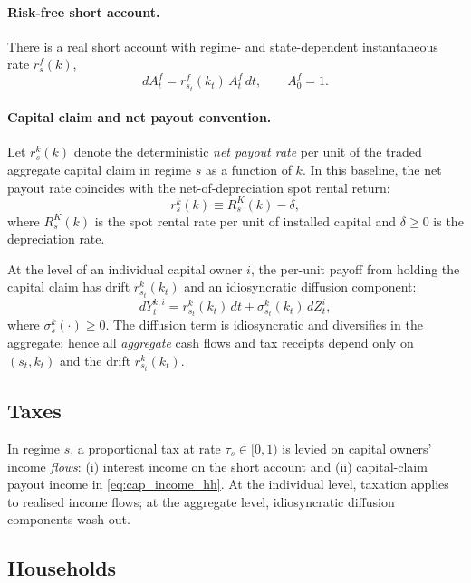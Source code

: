 \documentclass{article}
\begin{document}
\paragraph{Risk-free short account.}
There is a real short account with regime- and state-dependent instantaneous rate $r^f_s(k)$,
\begin{equation}\label{eq:safe_account_hh}
dA^f_t = r^f_{s_t}(k_t)\,A^f_t\,dt, \qquad A^f_0=1.
\end{equation}

\paragraph{Capital claim and net payout convention.}
Let $r^k_s(k)$ denote the deterministic \emph{net payout rate} per unit of the traded aggregate capital claim in regime $s$ as a function of $k$.
In this baseline, the net payout rate coincides with the net-of-depreciation spot rental return:
\begin{equation}\label{eq:rk_equals_rental_netdep}
r^k_s(k) \equiv R^K_s(k) - \delta,
\end{equation}
where $R^K_s(k)$ is the spot rental rate per unit of installed capital and $\delta\ge 0$ is the depreciation rate.

At the level of an individual capital owner $i$, the per-unit payoff from holding the capital claim has drift $r^k_{s_t}(k_t)$ and an idiosyncratic diffusion component:
\begin{equation}\label{eq:cap_income_hh}
dY^{k,i}_t = r^k_{s_t}(k_t)\,dt + \sigma^k_{s_t}(k_t)\,dZ^i_t,
\end{equation}
where $\sigma^k_s(\cdot)\ge 0$. The diffusion term is idiosyncratic and diversifies in the aggregate; hence all \emph{aggregate} cash flows and tax receipts
depend only on $(s_t,k_t)$ and the drift $r^k_{s_t}(k_t)$.

\subsection{Taxes}

In regime $s$, a proportional tax at rate $\tau_s\in[0,1)$ is levied on capital owners' income \emph{flows}:
(i) interest income on the short account and (ii) capital-claim payout income in \eqref{eq:cap_income_hh}.
At the individual level, taxation applies to realised income flows; at the aggregate level, idiosyncratic diffusion components wash out.

\subsection{Households}
\end{document}
